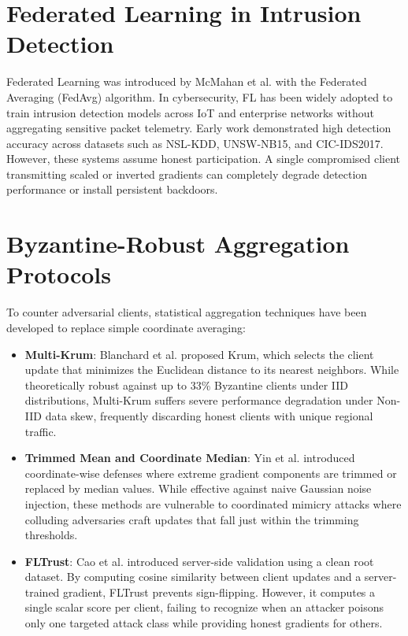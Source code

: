 \documentclass[12pt,a4paper]{report}
\begin{document}
\section{Federated Learning in Intrusion Detection}
Federated Learning was introduced by McMahan et al. with the Federated Averaging (FedAvg) algorithm. In cybersecurity, FL has been widely adopted to train intrusion detection models across IoT and enterprise networks without aggregating sensitive packet telemetry. Early work demonstrated high detection accuracy across datasets such as NSL-KDD, UNSW-NB15, and CIC-IDS2017. However, these systems assume honest participation. A single compromised client transmitting scaled or inverted gradients can completely degrade detection performance or install persistent backdoors.

\section{Byzantine-Robust Aggregation Protocols}
To counter adversarial clients, statistical aggregation techniques have been developed to replace simple coordinate averaging:
\begin{itemize}
    \item \textbf{Multi-Krum}: Blanchard et al. proposed Krum, which selects the client update that minimizes the Euclidean distance to its nearest neighbors. While theoretically robust against up to 33\% Byzantine clients under IID distributions, Multi-Krum suffers severe performance degradation under Non-IID data skew, frequently discarding honest clients with unique regional traffic.
    \item \textbf{Trimmed Mean and Coordinate Median}: Yin et al. introduced coordinate-wise defenses where extreme gradient components are trimmed or replaced by median values. While effective against naive Gaussian noise injection, these methods are vulnerable to coordinated mimicry attacks where colluding adversaries craft updates that fall just within the trimming thresholds.
    \item \textbf{FLTrust}: Cao et al. introduced server-side validation using a clean root dataset. By computing cosine similarity between client updates and a server-trained gradient, FLTrust prevents sign-flipping. However, it computes a single scalar score per client, failing to recognize when an attacker poisons only one targeted attack class while providing honest gradients for others.
\end{itemize}
\end{document}
